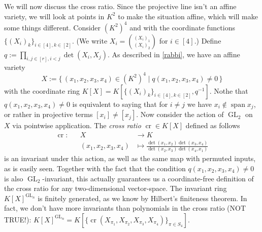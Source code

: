 \begin{example}
  We will now discuss the cross ratio.
  Since the projective line isn't an affine variety, we will look at points in $K^2$ to make the situation affine, which will make some things different.
  Consider $(K^2)^4$ and with the coordinate functions $\{(X_i)_k\}_{i \in [4], k \in [2]}$.
  (We write $X_i = \binom{(X_i)_1}{(X_i)_2}$ for $i \in [4]$.)
  Define $q := \prod_{i,j \in [r], i<j} \operatorname{det}(X_i,X_j)$.
  As described in \ref{rabbi}, we have an affine variety
  \begin{equation}
    X := \{\, (x_1,x_2,x_3,x_4) \in (K^2)^4 \mid q(x_1,x_2,x_3,x_4) \neq 0 \,\}
  \end{equation}
  with the coordinate ring $K[X] = K[\{(X_i)_k\}_{i \in [4], k \in [2]},q^{-1}]$.
  Nothe that $q(x_1,x_2,x_3,x_4) \neq 0$ is equivalent to saying that for $i\neq j$ we have $x_i \notin \operatorname{span}{x_j}$, or rather in projective terms $[x_i] \neq [x_j]$.
  Now consider the action of $\operatorname{GL}_2$ on $X$ via pointwise application.
  The \textit{cross ratio} $\operatorname{cr} \in K[X]$ defined as follows
  \begin{equation}
    \begin{aligned}
      \operatorname{cr} \colon&&X&\longrightarrow K \\
      &&(x_1,x_2,x_3,x_4) &\longmapsto \frac{\operatorname{det}(x_1,x_2)\operatorname{det}(x_3,x_4)}{\operatorname{det}(x_2,x_3)\operatorname{det}(x_4,x_1)}
    \end{aligned}
  \end{equation}
  is an invariant under this action, as well as the same map with permuted inputs, as is easily seen.
  Together with the fact that the condition $q(x_1,x_2,x_3,x_4) \neq 0$ is also $\operatorname{GL}_2$-invariant, this actually guarantees us a coordinate-free definition of the cross ratio for any two-dimensional vector-space.
  The invariant ring $K[X]^{\operatorname{GL}_n}$ is finitely generated, as we know by Hilbert's finiteness theorem.
  In fact, we don't have more invariants than polynomials in the cross ratio (NOT TRUE!): $K[X]^{\operatorname{GL}_n} = K[\{\operatorname{cr}(X_{\pi_1},X_{\pi_2},X_{\pi_3},X_{\pi_4})\}_{\pi \in S_4}]$.

\end{example}
